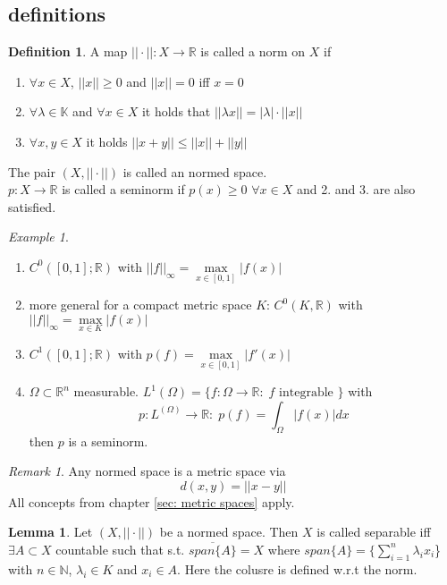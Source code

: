 \documentclass[a4paper, 12pt]{article}
\theoremstyle{plain}
\theoremstyle{definition}
\newtheorem{definition}[theorem]{Definition} %
\theoremstyle{lemma}
\newtheorem{lemma}[theorem]{Lemma}
\theoremstyle{remark}
\newtheorem{remark}[theorem]{Remark}
\theoremstyle{corollary}
\theoremstyle{example}
\newtheorem{example}[theorem]{Example}
\begin{document}
	\subsection{definitions}
	\begin{definition}
		A map $||\cdot||: X \to \mathbb{R}$ is called a norm on $X$ if \begin{enumerate}
			\item $\forall x \in X$, $||x||\geq 0$ and $||x|| = 0$ iff $x = 0$
			\item $\forall \lambda \in \mathbb{K}$ and $\forall x \in X$ it holds that $||\lambda x|| = \left|\lambda\right|\cdot ||x||$
			\item $\forall x, y \in X$ it holds $||x+y|| \leq ||x|| + ||y||$
		\end{enumerate}
		The pair $(X,||\cdot||)$ is called an normed space.\\
		
		\noindent $p:X \to \mathbb{R}$ is called a seminorm if $p(x) \geq 0$ $\forall x \in X$ and 2. and 3. are also satisfied.
	\end{definition}

	\begin{example}
		\begin{enumerate}
			\item $C^0([0,1]; \mathbb{R})$ with $||f||_\infty = \max\limits_{x \in [0,1]} \left|f(x)\right|$
			\item more general for a compact metric space $K$: $C^0(K,\mathbb{R})$ with $||f||_\infty = \max\limits_{x \in K} \left|f(x)\right|$
			\item $C^1([0,1]; \mathbb{R})$ with $p(f) = \max\limits_{x \in [0,1]} \left|f'(x)\right|$
			\item $\Omega \subset \mathbb{R}^n$ measurable. $L^1(\Omega) = \{f: \Omega \to \mathbb{R}: \; f \text{ integrable }\}$ with \[p: L^(\Omega) \to \mathbb{R}: \; p(f) = \int_{\Omega} \left|f(x)\right|dx\] then $p$ is a seminorm.
		\end{enumerate}
	\end{example}
	\begin{remark}
		Any normed space is a metric space via \[d(x,y) = ||x-y||\] All concepts from chapter \ref{sec: metric spaces} apply.
	\end{remark}

	\begin{lemma}
		Let $(X,||\cdot||)$ be a normed space. Then $X$ is called separable iff $\exists A \subset X$ countable such that s.t. $\overline{span\{A\}} = X$ where $span\{A\} = \{\sum_{i=1}^{n} \lambda_i x_i$\} with $n \in \mathbb{N}$, $\lambda_i \in K$ and $x_i \in A$. Here the colusre is defined w.r.t the norm.
	\end{lemma}
\end{document}
